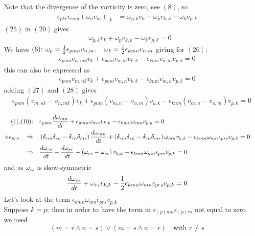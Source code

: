 Note that the divergence of the vorticity is zero, see $(8)$, so 
\begin{align}
 \epsilon_{pkr}\epsilon_{rnm}\left(\omega_n v_m\right)_{,k}
&= \omega_{p,k}v_k+\omega_pv_{k,k}-\omega_kv_{p,k}
\end{align}
$(25)$ in $(20)$ gives 
\begin{align}
&\omega_{p,k}v_k+\omega_pv_{k,k}-\omega_kv_{p,k} =0
\end{align}
We have $\text{(6): } \omega_p=\frac{1}{2}\epsilon_{pmn}v_{n,m},\quad \omega_k=\frac{1}{2}\epsilon_{kmn}v_{n,m}$
 giving for $(26)$:
\begin{align}
\epsilon_{pmn}v_{n,mk}v_k+\epsilon_{pmn}v_{n,m}v_{k,k}-\epsilon_{kmn}v_{n,m}v_{p,k} =0
\end{align}
this can also be expressed as 
\begin{align}
\epsilon_{pnm}v_{m,nk}v_k+\epsilon_{pnm}v_{m,n}v_{k,k}-\epsilon_{knm}v_{m,n}v_{p,k} =0
\end{align}
adding $(27)$ and $(28)$ gives 
\begin{align}
&\epsilon_{pnm}\left(v_{m,nk}-v_{n,mk}\right)v_k+\epsilon_{pnm}\left(v_{m,n}-v_{n,m}\right)v_{k,k}-\epsilon_{knm}\left(v_{m,n}-v_{n,m}\right)v_{p,k} =0
\end{align}

\begin{align}
\text{(1),(10):}\quad &\epsilon_{pmn}\dv{\omega_{mn}}{t}+\epsilon_{pmn}\omega_{mn}v_{k,k}-\epsilon_{kmn}\omega_{mn}v_{p,k} =0\\
\times \epsilon_{prs}\quad\Rightarrow\quad &\left(\delta_{rm}\delta_{sn}-\delta_{rn}\delta_{ms}\right)\dv{\omega_{mn}}{t}+\left(\delta_{rm}\delta_{sn}-\delta_{rn}\delta_{ms}\right)\omega_{mn}v_{k,k}-\epsilon_{kmn}\omega_{mn}\epsilon_{prs}v_{p,k} =0\\
\Rightarrow\quad &\dv{\omega_{rs}}{t}-\dv{\omega_{sr}}{t}+\left(\omega_{rs}-\omega_{sr}\right)v_{k,k}-\epsilon_{kmn}\omega_{mn}\epsilon_{prs}v_{p,k} =0
\end{align}
and as $\omega_{rs}$ is skew-symmetric
\begin{align}
\dv{\omega_{rs}}{t}+\omega_{rs}v_{k,k}-\frac{1}{2}\epsilon_{kmn}\omega_{mn}\epsilon_{prs}v_{p,k} =0
\end{align}
Let's look at the term $\epsilon_{kmn}\omega_{mn}\epsilon_{prs}v_{p,k} $\\
Suppose $k=p$; then in order to have the term in $\epsilon_{(p)mn}\epsilon_{(p)rs}$ not equal to zero we need
 $$\left(m=r \wedge n=s\right) \vee \left(m=s  \wedge  n=r \right)\quad \text{with } r\neq s$$

